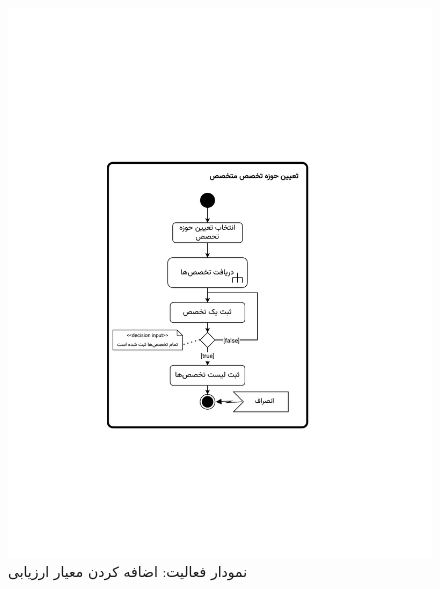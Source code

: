 \begin{figure}[ht!]
	\centering
	\includegraphics[scale=0.8, page=9]{figs/OOD-activity21-30.pdf}
	\caption{نمودار فعالیت: اضافه کردن معیار ارزیابی}
\end{figure}
\FloatBarrier
\newpage

